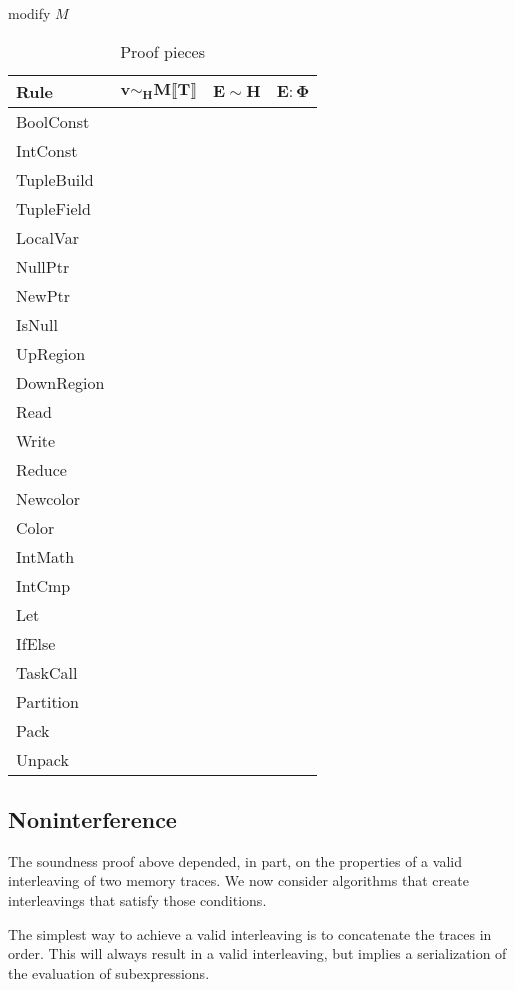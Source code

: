 modify $M$
\begin{table*}
\centering
{\small
\begin{tabular}{l|p{5cm}|p{5cm}|p{5cm}}
{\bf Rule} & 
\multicolumn{1}{|c|}{$\mathbf{v \sim_H M \llbracket T \rrbracket}$} &
\multicolumn{1}{|c|}{$\mathbf{E \sim H}$} &
\multicolumn{1}{|c|}{$\mathbf{E : \Phi}$} \\
\hline
BoolConst & & & \\
IntConst & & & \\
TupleBuild & & & \\
TupleField & & & \\
LocalVar & & & \\
NullPtr & & & \\
NewPtr & & & \\
IsNull & & & \\
UpRegion & & & \\
DownRegion & & & \\
Read & & & \\
Write & & & \\
Reduce & & & \\
Newcolor & & & \\
Color & & & \\
IntMath & & & \\
IntCmp & & & \\
Let & & & \\
IfElse & & & \\
TaskCall & & & \\
Partition & & & \\
Pack & & & \\
Unpack & & &
\end{tabular}}
\caption{Proof pieces}
\end{table*}


\subsection{Noninterference}

The soundness proof above depended, in part, on the properties of a valid interleaving of two
memory traces.  We now consider algorithms that create interleavings that satisfy those
conditions.

The simplest way to achieve a valid interleaving is to concatenate the traces in order.  This
will always result in a valid interleaving, but implies a serialization of the evaluation of
subexpressions.

